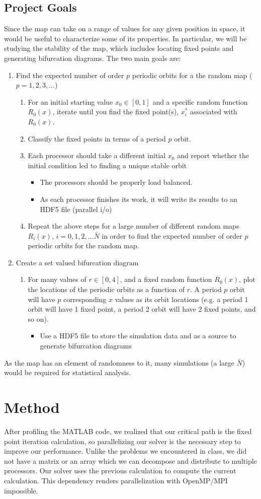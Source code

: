 \documentclass[12pt]{article}
\newcommand{\be}{\begin{enumerate}}
\newcommand{\ee}{\end{enumerate}}
\newcommand{\bi}{\begin{itemize}}
\newcommand{\ei}{\end{itemize}}
\begin{document}
\subsection{Project Goals}
Since the map can take on a range of values for any given position in
space, it would be useful to characterize some of its properties. In particular, we will be studying the stability of the map,
which includes locating fixed points and generating bifurcation
diagrams. The two main goals are:
\be
\item Find the expected number of order $p$ periodic orbits for a
  the random map ($p = 1, 2, 3, ...$)
\be
\item For an initial starting value $x_0 \in [0,1]$ and a specific
  random function $R_0(x)$, iterate until you
  find the fixed point(s), $x_i^*$ associated with $R_0(x)$. 
\item Classify the fixed points in terms of a period $p$ orbit. 
\item Each processor should take a different initial $x_0$ and report
  whether the initial condition led to finding a unique stable orbit  
\bi
\item The processors should be properly load balanced.
\item As each processor finishes its work, it will write its results
  to an HDF5 file (parallel i/o)
\ei
\item Repeat the above steps for a large number of different random
  maps $R_i(x)$, $i = 0, 1, 2,... \bar{N}$ in order to find the expected
  number of order $p$ periodic orbits for the random map.
\ee
\item Create a set valued bifurcation diagram \cite{lamb}
\be
\item For many values of $r \in [0,4]
$, and a fixed random function
  $R_0(x)$, plot the locations of the periodic orbits as a function of
  $r$. A period $p$ orbit will have $p$ corresponding $x$ values as
  its orbit locations (e.g. a period 1 orbit will have 1 fixed point,
  a period 2 orbit will have 2 fixed points, and so on). 
\bi
\item Use a HDF5 file to store the simulation data and as a source to generate
  bifurcation diagrams
\ei
\ee
\ee
As the map has an element of randomness to it, many
simulations (a large $\bar{N}$) would be required for statistical analysis. 
\section{Method}
\hspace{5mm} After profiling the MATLAB code, we realized that our critical path is
the fixed point iteration calculation, so parallelizing our solver is
the necessary step to improve our performance. Unlike the problems we
encountered in class, we did not have a matrix or an array which we
can decompose and distribute to multiple processors. Our solver uses
the previous calculation to compute the current calculation. This
dependency renders parallelization with OpenMP/MPI impossible. 
\end{document}
